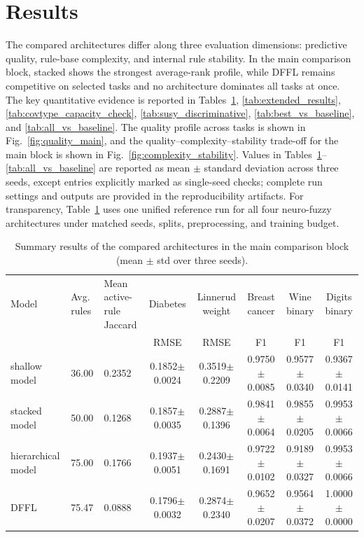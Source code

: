 \documentclass[runningheads]{llncs}
\begin{document}
\section{Results}

The compared architectures differ along three evaluation dimensions: predictive quality, rule-base complexity, and internal rule stability. In the main comparison block, stacked shows the strongest average-rank profile, while DFFL remains competitive on selected tasks and no architecture dominates all tasks at once.
The key quantitative evidence is reported in Tables~\ref{tab:main_results}, \ref{tab:extended_results}, \ref{tab:covtype_capacity_check}, \ref{tab:susy_discriminative}, \ref{tab:best_vs_baseline}, and \ref{tab:all_vs_baseline}. The quality profile across tasks is shown in Fig.~\ref{fig:quality_main}, and the quality--complexity--stability trade-off for the main block is shown in Fig.~\ref{fig:complexity_stability}.
Values in Tables~\ref{tab:main_results}--\ref{tab:all_vs_baseline} are reported as mean $\pm$ standard deviation across three seeds, except entries explicitly marked as single-seed checks; complete run settings and outputs are provided in the reproducibility artifacts.
For transparency, Table~\ref{tab:main_results} uses one unified reference run for all four neuro-fuzzy architectures under matched seeds, splits, preprocessing, and training budget.

\begin{table}[H]
\centering
\caption{Summary results of the compared architectures in the main comparison block (mean $\pm$ std over three seeds).}
\label{tab:main_results}
\scriptsize
\setlength{\tabcolsep}{1.5pt}
\begin{tabular}{lllccccc}
\toprule
Model & Avg. rules & \makecell[c]{Mean active-rule\\Jaccard} & Diabetes & Linnerud weight & Breast cancer & Wine binary & Digits binary\\
 &  &  & RMSE & RMSE & F1 & F1 & F1 \\
\midrule
shallow model      & 36.00 & 0.2352 & 0.1852$\pm$0.0024 & 0.3519$\pm$0.2209 & 0.9750$\pm$0.0085 & 0.9577$\pm$0.0340 & 0.9367$\pm$0.0141 \\
stacked model      & 50.00 & 0.1268 & 0.1857$\pm$0.0035 & 0.2887$\pm$0.1396 & 0.9841$\pm$0.0064 & 0.9855$\pm$0.0205 & 0.9953$\pm$0.0066 \\
hierarchical model & 75.00 & 0.1766 & 0.1937$\pm$0.0051 & 0.2430$\pm$0.1691 & 0.9722$\pm$0.0102 & 0.9189$\pm$0.0327 & 0.9953$\pm$0.0066 \\
DFFL               & 75.47 & 0.0888 & 0.1796$\pm$0.0032 & 0.2874$\pm$0.2340 & 0.9652$\pm$0.0207 & 0.9564$\pm$0.0372 & 1.0000$\pm$0.0000 \\
\bottomrule
\end{tabular}
\end{table}
\end{document}

